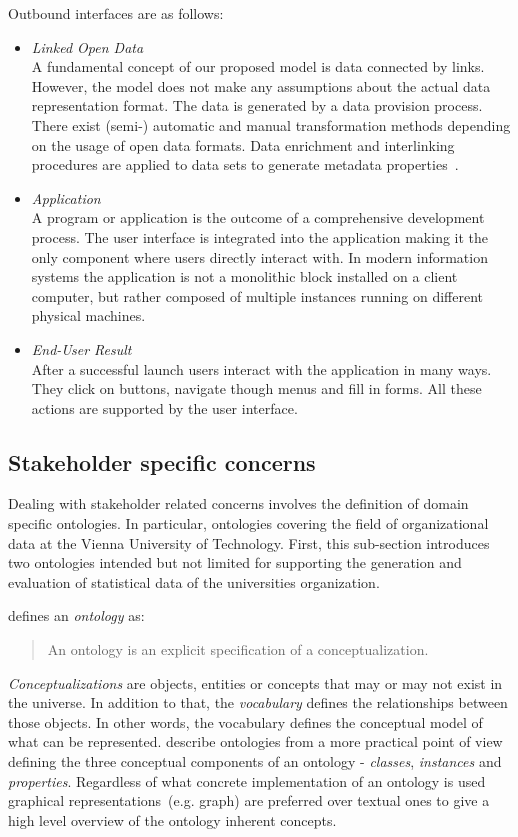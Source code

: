 \documentclass{article}
\begin{document}
Outbound interfaces are as follows:
\begin{itemize}
	\item \textit{Linked Open Data}~\\
	A fundamental concept of our proposed model is data connected by links. However, the model does not make any assumptions about the actual data representation format. The data is generated by a data provision process. There exist (semi-) automatic and manual transformation methods depending on the usage of open data formats. Data enrichment and interlinking procedures are applied to data sets to generate metadata properties~\cite{inproceedings:soa-architecture}. 
	\item \textit{Application}~\\
	A program or application is the outcome of a comprehensive development process. The user interface is integrated into the application making it the only component where users directly interact with. In modern information systems the application is not a monolithic block installed on a client computer, but rather composed of multiple instances running on different physical machines. 
	\item \textit{End-User Result}~\\
	After a successful launch users interact with the application in many ways. They click on buttons, navigate though menus and fill in forms. All these actions are supported by the user interface.
\end{itemize}

\subsection{Stakeholder specific concerns}
\label{sec:ontologies}
Dealing with stakeholder related concerns involves the definition of domain specific ontologies. In particular, ontologies covering the field of organizational data at the Vienna University of Technology. First, this sub-section introduces two ontologies intended but not limited for supporting the generation and evaluation of statistical data of the universities organization. 

\citet{jour:gruber} defines an \textit{ontology} as:
\begin{quotation}
An ontology is an explicit specification of a conceptualization.
\end{quotation}
\textit{Conceptualizations} are objects, entities or concepts that may or may not exist in the universe. In addition to that, the \textit{vocabulary} defines the relationships between those objects. In other words, the vocabulary defines the conceptual model of what can be represented. 
\citet{jour:owl} describe ontologies from a more practical point of view defining the three conceptual components of an ontology - \textit{classes}, \textit{instances} and \textit{properties}. Regardless of what concrete implementation of an ontology is used graphical representations~(e.g. graph) are preferred over textual ones to give a high level overview of the ontology inherent concepts. 
\end{document}
